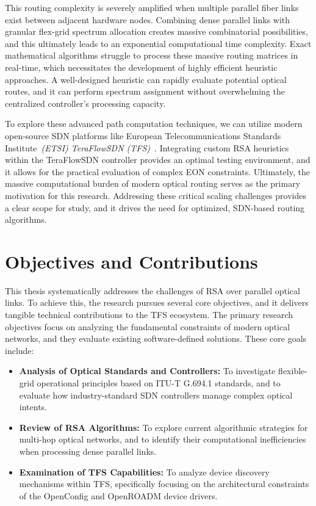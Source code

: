 \documentclass[12pt, a4paper, twoside, openright]{report}
\begin{document}
This routing complexity is severely amplified when multiple parallel fiber links exist between adjacent hardware nodes. Combining dense parallel links with granular flex-grid spectrum allocation creates massive combinatorial possibilities, and this ultimately leads to an exponential computational time complexity. Exact mathematical algorithms struggle to process these massive routing matrices in real-time, which necessitates the development of highly efficient heuristic approaches. A well-designed heuristic can rapidly evaluate potential optical routes, and it can perform spectrum assignment without overwhelming the centralized controller's processing capacity.

To explore these advanced path computation techniques, we can utilize modern open-source SDN platforms like  European Telecommunications Standards Institute~\emph{(ETSI) TeraFlowSDN (TFS)}~\cite{aboutTFS}. Integrating custom RSA heuristics within the TeraFlowSDN controller provides an optimal testing environment, and it allows for the practical evaluation of complex EON constraints. Ultimately, the massive computational burden of modern optical routing serves as the primary motivation for this research. Addressing these critical scaling challenges provides a clear scope for study, and it drives the need for optimized, SDN-based routing algorithms.

\section{Objectives and Contributions}
This thesis systematically addresses the challenges of RSA over parallel optical links. To achieve this, the research pursues several core objectives, and it delivers tangible technical contributions to the TFS ecosystem.
The primary research objectives focus on analyzing the fundamental constraints of modern optical networks, and they evaluate existing software-defined solutions. These core goals include:
\begin{itemize}
    \item \textbf{Analysis of Optical Standards and Controllers:} To investigate flexible-grid operational principles based on ITU-T G.694.1 standards, and to evaluate how industry-standard SDN controllers manage complex optical intents.
    \item \textbf{Review of RSA Algorithms:} To explore current algorithmic strategies for multi-hop optical networks, and to identify their computational inefficiencies when processing dense parallel links.
    \item \textbf{Examination of TFS Capabilities:} To analyze device discovery mechanisms within TFS, specifically focusing on the architectural constraints of the OpenConfig and OpenROADM device drivers.
\end{itemize}
\end{document}
